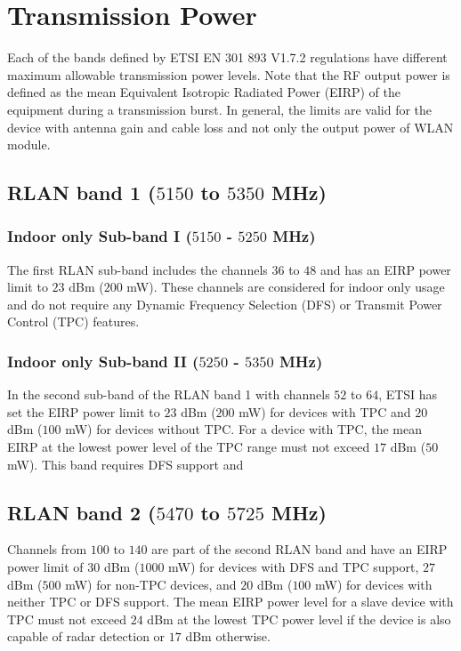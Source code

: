 \section{Transmission Power}

Each of the bands defined by ETSI EN 301 893 V1.7.2 regulations \cite{LBT-ETSI-2014} have different maximum allowable transmission power levels. Note that the RF output power is defined as the mean Equivalent Isotropic Radiated Power (EIRP) of the equipment during a transmission burst. In general, the limits are valid for the device with antenna gain and cable loss and not only the output power of WLAN module.

\subsection{RLAN band 1 ($5150$ to $5350$ MHz)} %

\subsubsection{Indoor only Sub-band I ($5150$ - $5250$ MHz)}
The first RLAN sub-band includes the channels $36$ to $48$ and has an EIRP power limit to $23$ dBm ($200$ mW). These channels are considered for indoor only usage and do not require any Dynamic Frequency Selection (DFS) or Transmit Power Control (TPC) features. 

\subsubsection{Indoor only Sub-band II ($5250$ - $5350$ MHz)}
In the second sub-band of the RLAN band 1 with channels $52$ to $64$, ETSI has set the EIRP power limit to $23$ dBm ($200$ mW) for devices with TPC and $20$ dBm ($100$ mW) for devices without TPC. For a device with TPC, the mean EIRP at the lowest power level of the TPC range must not exceed $17$ dBm ($50$ mW). This band requires DFS support and %

\subsection{RLAN band 2 ($5470$ to $5725$ MHz)}

Channels from $100$ to $140$ are part of the second RLAN band and have an EIRP power limit of $30$ dBm ($1000$ mW) for devices with DFS and TPC support, $27$ dBm ($500$ mW) for non-TPC devices, and $20$ dBm ($100$ mW) for devices with neither TPC or DFS support. The mean EIRP power level for a slave device with TPC must not exceed $24$ dBm at the lowest TPC power level if the device is also capable of radar detection or $17$ dBm otherwise. 

